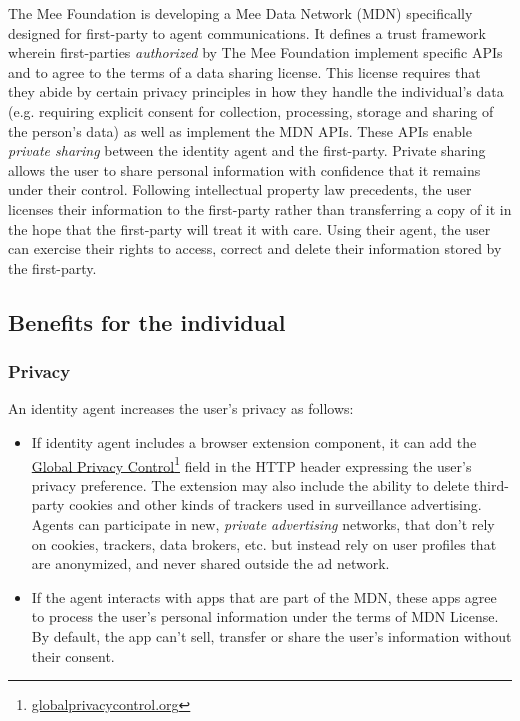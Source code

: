\documentclass[11pt, oneside]{article}   	%
\newcommand{\hyperfootnote}[1][]{\def\ArgI{{#1}}\hyperfootnoteRelay}
\newcommand\hyperfootnoteRelay[2][]{\href{#1#2}{\ArgI}\footnote{\href{#1#2}{#2}}}
\begin{document}
The Mee Foundation is developing a Mee Data Network (MDN) specifically designed for first-party to agent communications. It defines a trust framework wherein first-parties \emph{authorized} by The Mee Foundation implement specific APIs and to agree to the terms of a data sharing license. This license requires that they abide by certain privacy principles in how they handle the individual's data (e.g. requiring explicit consent for collection, processing, storage and sharing of the person's data) as well as implement the MDN APIs. These APIs enable \emph{private sharing} between the identity agent and the first-party. Private sharing allows the user to share personal information with confidence that it remains under their control. Following intellectual property law precedents, the user licenses their information to the first-party rather than transferring a copy of it in the hope that the first-party will treat it with care. Using their agent, the user can exercise their rights to access, correct and delete their information stored by the first-party.

\subsection{Benefits for the individual}

\subsubsection{Privacy}

An identity agent increases the user's privacy as follows:
\begin{itemize}
	\item If identity agent includes a browser extension component, it can add the \hyperfootnote[Global Privacy Control][https://]{globalprivacycontrol.org} field in the HTTP header expressing the user's privacy preference. The extension may also include the ability to delete third-party cookies and other kinds of trackers used in surveillance advertising. Agents can participate in new, \emph{private advertising} networks, that don't rely on cookies, trackers, data brokers, etc. but instead rely on user profiles that are anonymized, and never shared outside the ad network. 
	\item If the agent interacts with apps that are part of the MDN, these apps agree to process the user's personal information under the terms of MDN License. By default, the app can't sell, transfer or share the user's information without their consent. 
\end{itemize}
\end{document}

